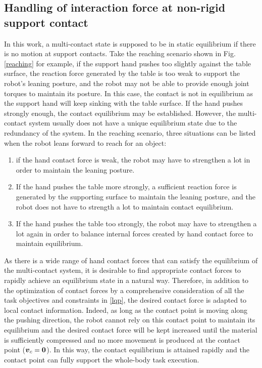 \documentclass[letterpaper, 10 pt, conference]{ieeeconf}  %
\newcommand{\vect}[1]{\mbox{\boldmath${#1}$}}%
\begin{document}
\subsection{Handling of interaction force at non-rigid support contact}
\label{balance}
In this work, a multi-contact state is supposed to be in static equilibrium if there is no motion at support contacts.
Take the reaching scenario shown in Fig. \ref{reaching} for example, if the support hand pushes too slightly against the table surface, the reaction force generated by the table is too weak to support the robot's leaning posture, and the robot may not be able to provide enough joint torques to maintain its posture. In this case, the contact is not in equilibrium as the support hand will keep sinking with the table surface.
If the hand pushes strongly enough, the contact equilibrium may be established.
However, the multi-contact system usually does not have a unique equilibrium state due to the redundancy of the system.   
In the reaching scenario, three situations can be listed when the robot leans forward to reach for an object:
\begin{enumerate}
	\item if the hand contact force is weak, the robot may have to strengthen a lot in order to maintain the leaning posture.
	\item If the hand pushes the table more strongly, a sufficient reaction force is generated by the supporting surface to maintain the leaning posture, and the robot does not have to strength a lot to maintain contact equilibrium.
  \item If the hand pushes the table too strongly, the robot may have to strengthen a lot again in order to balance internal forces created by hand contact force to maintain equilibrium.
\end{enumerate}
As there is a wide range of hand contact forces that can satisfy the equilibrium of the multi-contact system, it is desirable to find appropriate contact forces to rapidly achieve an equilibrium state in a natural way. Therefore, in addition to the optimization of contact forces by a comprehensive consideration of all the task objectives and constraints in \eqref{lqp}, the desired contact force is adapted to local contact information. Indeed, as long as the contact point is moving along the pushing direction, the robot cannot rely on this contact point to maintain its equilibrium and the desired contact force will be kept increased until the material is sufficiently compressed and no more movement is produced at the contact point ($\vect{v}_c=\vect{0}$). In this way, the contact equilibrium is attained rapidly and the contact point can fully support the whole-body task execution.
\end{document}
